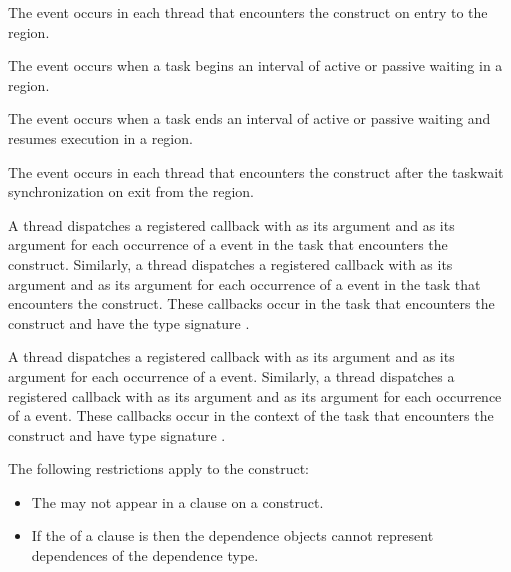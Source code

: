 \events

The  event occurs in each thread that encounters the
 construct on entry to the  region.

The  event occurs when a task begins an interval 
of active or passive waiting in a  region.

The  event occurs when a task ends an interval of 
active or passive waiting and resumes execution in a  region.

The  event occurs in each thread that encounters the
 construct after the taskwait synchronization on exit 
from the  region.

\tools

A thread dispatches a registered 
callback with  as its  argument
and  as its  argument for each
occurrence of a  event in the task that encounters
the  construct. Similarly, a thread dispatches a registered
 callback with 
as its  argument and  as its 
argument for each  occurrence of a  event in the task that
encounters the  construct. These callbacks occur in the task that
encounters the  construct and have the type signature
.

A thread dispatches a registered  callback
with  as its  argument and
 as its  argument for each occurrence of
a  event. Similarly, a thread dispatches a registered
 callback with 
as its  argument and  as its  argument
for each occurrence of a  event. These callbacks occur in the
context of the task that encounters the  construct and have type 
signature .

\restrictions
The following restrictions apply to the  construct:

\begin{itemize}
\item The   may not appear in a
       clause on a  construct.
\item If the  of a  clause is 
      then the dependence  objects cannot represent dependences of the 
        dependence type.
\end{itemize}

